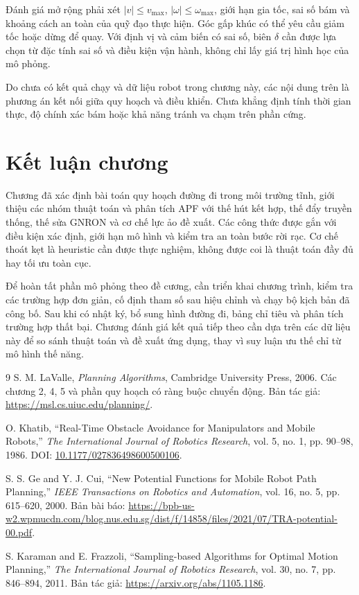 \documentclass[12pt,a4paper,oneside]{report}
\numberwithin{equation}{chapter}
\begin{document}
Đánh giá mở rộng phải xét $|v|\le v_{\max}$, $|\omega|\le\omega_{\max}$, giới hạn gia tốc, sai số bám và khoảng cách an toàn của quỹ đạo thực hiện. Góc gấp khúc có thể yêu cầu giảm tốc hoặc dừng để quay. Với định vị và cảm biến có sai số, biên $\delta$ cần được lựa chọn từ đặc tính sai số và điều kiện vận hành, không chỉ lấy giá trị hình học của mô phỏng.

Do chưa có kết quả chạy và dữ liệu robot trong chương này, các nội dung trên là phương án kết nối giữa quy hoạch và điều khiển. Chưa khẳng định tính thời gian thực, độ chính xác bám hoặc khả năng tránh va chạm trên phần cứng.

\section{Kết luận chương}

Chương đã xác định bài toán quy hoạch đường đi trong môi trường tĩnh, giới thiệu các nhóm thuật toán và phân tích APF với thế hút kết hợp, thế đẩy truyền thống, thế sửa GNRON và cơ chế lực ảo đề xuất. Các công thức được gắn với điều kiện xác định, giới hạn mô hình và kiểm tra an toàn bước rời rạc. Cơ chế thoát kẹt là heuristic cần được thực nghiệm, không được coi là thuật toán đầy đủ hay tối ưu toàn cục.

Để hoàn tất phần mô phỏng theo đề cương, cần triển khai chương trình, kiểm tra các trường hợp đơn giản, cố định tham số sau hiệu chỉnh và chạy bộ kịch bản đã công bố. Sau khi có nhật ký, bổ sung hình đường đi, bảng chỉ tiêu và phân tích trường hợp thất bại. Chương đánh giá kết quả tiếp theo cần dựa trên các dữ liệu này để so sánh thuật toán và đề xuất ứng dụng, thay vì suy luận ưu thế chỉ từ mô hình thế năng.

\begin{thebibliography}{9}
S. M. LaValle, \textit{Planning Algorithms}, Cambridge University Press, 2006. Các chương 2, 4, 5 và phần quy hoạch có ràng buộc chuyển động. Bản tác giả: \url{https://msl.cs.uiuc.edu/planning/}.

O. Khatib, ``Real-Time Obstacle Avoidance for Manipulators and Mobile Robots,'' \textit{The International Journal of Robotics Research}, vol. 5, no. 1, pp. 90--98, 1986. DOI: \href{https://doi.org/10.1177/027836498600500106}{10.1177/027836498600500106}.

S. S. Ge and Y. J. Cui, ``New Potential Functions for Mobile Robot Path Planning,'' \textit{IEEE Transactions on Robotics and Automation}, vol. 16, no. 5, pp. 615--620, 2000. Bản bài báo: \url{https://bpb-us-w2.wpmucdn.com/blog.nus.edu.sg/dist/f/14858/files/2021/07/TRA-potential-00.pdf}.

S. Karaman and E. Frazzoli, ``Sampling-based Algorithms for Optimal Motion Planning,'' \textit{The International Journal of Robotics Research}, vol. 30, no. 7, pp. 846--894, 2011. Bản tác giả: \url{https://arxiv.org/abs/1105.1186}.
\end{thebibliography}
\end{document}
